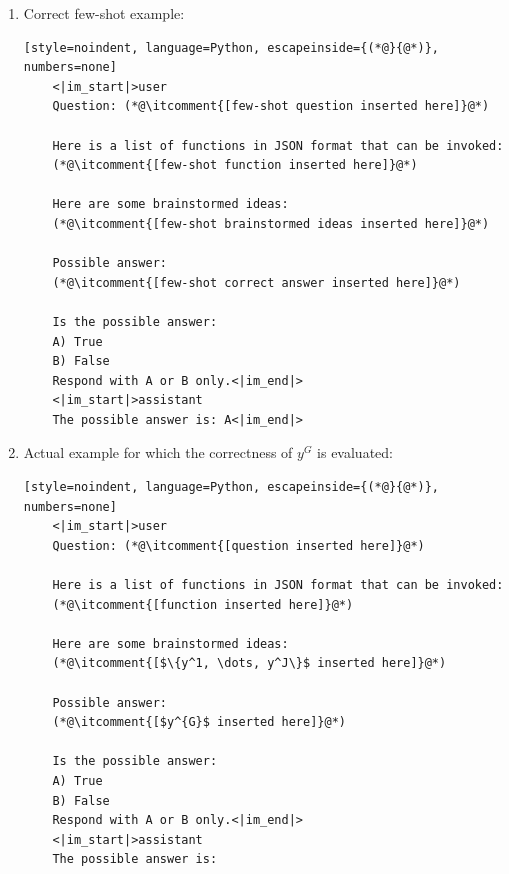 \begin{enumerate}
    \item Correct few-shot example: 
    \begin{lstlisting}[style=noindent, language=Python, escapeinside={(*@}{@*)}, numbers=none]
    <|im_start|>user
    Question: (*@\itcomment{[few-shot question inserted here]}@*)
    
    Here is a list of functions in JSON format that can be invoked:
    (*@\itcomment{[few-shot function inserted here]}@*)
    
    Here are some brainstormed ideas:
    (*@\itcomment{[few-shot brainstormed ideas inserted here]}@*)
    
    Possible answer:
    (*@\itcomment{[few-shot correct answer inserted here]}@*)
    
    Is the possible answer:
    A) True
    B) False
    Respond with A or B only.<|im_end|>
    <|im_start|>assistant
    The possible answer is: A<|im_end|>
    \end{lstlisting}

    \item Actual example for which the correctness of $y^G$ is evaluated: 
    \begin{lstlisting}[style=noindent, language=Python, escapeinside={(*@}{@*)}, numbers=none]
    <|im_start|>user
    Question: (*@\itcomment{[question inserted here]}@*)
    
    Here is a list of functions in JSON format that can be invoked:
    (*@\itcomment{[function inserted here]}@*)
    
    Here are some brainstormed ideas:
    (*@\itcomment{[$\{y^1, \dots, y^J\}$ inserted here]}@*)
    
    Possible answer:
    (*@\itcomment{[$y^{G}$ inserted here]}@*)
    
    Is the possible answer:
    A) True
    B) False
    Respond with A or B only.<|im_end|>
    <|im_start|>assistant
    The possible answer is: 
    \end{lstlisting}
    
\end{enumerate}


